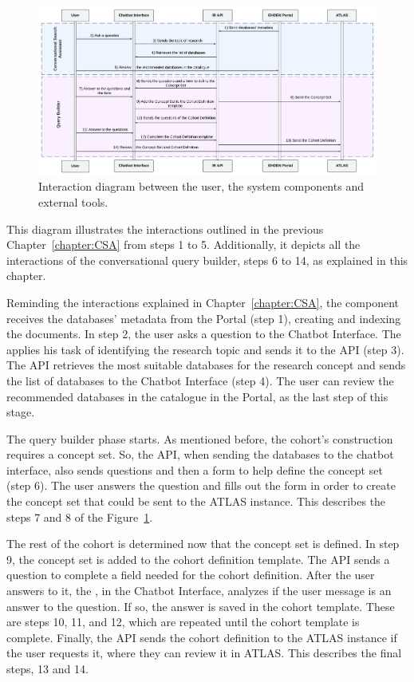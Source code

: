 \begin{figure}[H]
  \includegraphics[width=\textwidth]{figs/chapter4/interaction_diagram.png}
  \centering
  \caption[Interaction diagram between components]{Interaction diagram between the user, the system components and external tools.}
  \label{fig_interaction}
\end{figure}

This diagram illustrates the interactions outlined in the previous Chapter~\ref{chapter:CSA} from steps 1 to 5. Additionally, it depicts all the interactions of the conversational query builder, steps 6 to 14, as explained in this chapter.

Reminding the interactions explained in Chapter~\ref{chapter:CSA}, the {\ir} component receives the databases' metadata from the {\ehden} Portal (step 1), creating and indexing the documents. In step 2, the user asks a question to the Chatbot Interface. The {\llm} applies his task of identifying the research topic and sends it to the {\ir} API (step 3). The {\ir} API retrieves the most suitable databases for the research concept and sends the list of databases to the Chatbot Interface (step 4). The user can review the recommended databases in the catalogue in the {\ehden} Portal, as the last step of this stage.

The query builder phase starts. As mentioned before, the cohort's construction requires a concept set. So, the {\ir} API, when sending the databases to the chatbot interface, also sends questions and then a form to help define the concept set (step 6). The user answers the question and fills out the form in order to create the concept set that could be sent to the ATLAS instance. This describes the steps 7 and 8 of the Figure~\ref{fig_interaction}. 

The rest of the cohort is determined now that the concept set is defined. In step 9, the concept set is added to the cohort definition template. The {\ir} API sends a question to complete a field needed for the cohort definition. After the user answers to it, the {\llm}, in the Chatbot Interface, analyzes if the user message is an answer to the question. If so, the answer is saved in the cohort template. These are steps 10, 11, and 12, which are repeated until the cohort template is complete. Finally, the API sends the cohort definition to the ATLAS instance if the user requests it, where they can review it in ATLAS. This describes the final steps, 13 and 14. 


